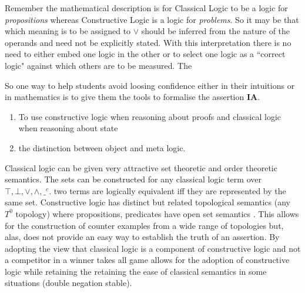 %
Remember the mathematical description is  for  Classical Logic to be a logic for \emph{propositions} whereas Constructive Logic is a logic for \emph{problems}. So it may be that which meaning is to be assigned to $\vee$ should be  inferred from the nature of the operands and need not be explicitly stated. With this interpretation there is no need to either embed one logic in the other or to select one logic as a ``correct logic" against which others are to be measured. The 

So one way to help students avoid  loosing confidence either in their intuitions or in mathematics is to give  them the tools to formalise the assertion {\bf IA}.
\begin{enumerate}
\item  To use constructive logic when reasoning about proofs and classical logic when reasoning about state
\item the distinction between object and meta logic.
\end{enumerate} 



 
 
Classical logic can be given very attractive set theoretic and order theoretic semantics. The sets can be constructed for any classical logic term over $\top,\bot,\vee,\land, \_^c$. two terms are logically equivalent iff they are represented by the same set.
Constructive logic  has distinct but related topological semantics (any $T^0$ topology) where propositions, predicates have open set semantics \cite{topo19,ConstructClassical}. This allows for the construction of counter examples from a wide range of topologies but, alas, does not provide an easy way to establish the truth of an assertion. By adopting the view that classical logic is a component of constructive logic and not a competitor in a winner takes all game allows for the adoption of constructive logic while retaining the retaining the ease of  classical semantics in some situations (double negation stable).

